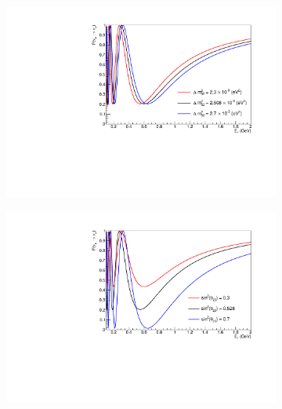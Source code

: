 \begin{figure}[h]
  \begin{subfigure}[t]{0.5\textwidth}
    \includegraphics[width=\textwidth, trim={0mm 0mm 0mm 0mm}, clip,page=1]{Figures/Oscillation/T2K_NuMu_x_NuMu_DelMsq32Sens.pdf}
    \subcaption{\delmsqatm}
  \end{subfigure}%
  \begin{subfigure}[t]{0.5\textwidth}
    \includegraphics[width=\textwidth, trim={0mm 0mm 0mm 0mm}, clip,page=1]{Figures/Oscillation/T2K_NuMu_x_NuMu_Sinsqth23Sens.pdf}
    \subcaption{\sinsqatm}
  \end{subfigure}
  \begin{subfigure}[t]{0.5\textwidth}

\end{subfigure}
\end{figure}
